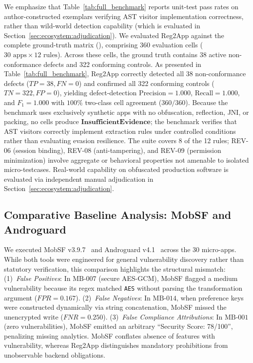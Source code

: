 We emphasize that Table~\ref{tab:full_benchmark} reports unit-test pass rates on author-constructed exemplars verifying AST visitor implementation correctness, rather than wild-world detection capability (which is evaluated in Section~\ref{sec:ecosystem:adjudication}). We evaluated Reg2App against the complete ground-truth matrix (), comprising 360 evaluation cells ($30 \text{ apps} \times 12 \text{ rules}$). Across these cells, the ground truth contains 38 active non-conformance defects and 322 conforming controls. As presented in Table~\ref{tab:full_benchmark}, Reg2App correctly detected all 38 non-conformance defects ($TP = 38, FN = 0$) and confirmed all 322 conforming controls ($TN = 322, FP = 0$), yielding defect-detection $\text{Precision} = 1.000$, $\text{Recall} = 1.000$, and $F_1 = 1.000$ with $100\%$ two-class cell agreement ($360/360$). Because the benchmark uses exclusively synthetic apps with no obfuscation, reflection, JNI, or packing, no cells produce $\mathbf{InsufficientEvidence}$; the benchmark verifies that AST visitors correctly implement extraction rules under controlled conditions rather than evaluating evasion resilience. The suite covers 8 of the 12 rules; REV-06 (session binding), REV-08 (anti-tampering), and REV-09 (permission minimization) involve aggregate or behavioral properties not amenable to isolated micro-testcases. Real-world capability on obfuscated production software is evaluated via independent manual adjudication in Section~\ref{sec:ecosystem:adjudication}.

\subsection{Comparative Baseline Analysis: MobSF and Androguard}
\label{sec:benchmark:baseline}

We executed MobSF v3.9.7~\cite{mobsf} and Androguard v4.1~\cite{androguard} across the 30 micro-apps. While both tools were engineered for general vulnerability discovery rather than statutory verification, this comparison highlights the structural mismatch:
(1)~\textit{False Positives}: In $\text{MB-007}$ (secure AES-GCM), MobSF flagged a medium vulnerability because its regex matched \texttt{AES} without parsing the transformation argument ($FPR = 0.167$).
(2)~\textit{False Negatives}: In $\text{MB-014}$, when preference keys were constructed dynamically via string concatenation, MobSF missed the unencrypted write ($FNR = 0.250$).
(3)~\textit{False Compliance Attributions}: In $\text{MB-001}$ (zero vulnerabilities), MobSF emitted an arbitrary ``Security Score: 78/100'', penalizing missing analytics. MobSF conflates absence of features with vulnerability, whereas Reg2App distinguishes mandatory prohibitions from unobservable backend obligations.

